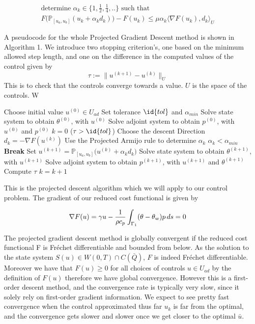 \begin{align*}
    \text{determine $\alpha_k \in \{1, \frac{1}{2},\frac{1}{4},.. \}$ such that } \\
    F \bigg (\mathbb{P}_{[u_a,u_b]}(u_k + \alpha_kd_k) \bigg ) - F(u_k) \leq \mu \alpha_k \langle \nabla F(u_k),d_k \rangle_{U}
\end{align*}

A pseudocode for the whole Projected Gradient Descent method is shown in Algorithm 1. We introduce two stopping criterion's, one based on the minimum allowed step length, and one on the difference in the computed values of the control given by 
\begin{equation}
    \label{eq:stopping}
    \tau := \|u^{(k+1)} - u^{(k)}\|_U 
\end{equation}
This is to check that the controls converge towards a value. $U$ is the space of the controls. W

\begin{codebox}
\li Choose initial value $u^{(0)}\in U_{ad}$
\li Set tolerance $\id{tol}$ and $\alpha_{min}$
\li Solve state system to obtain $\theta^{(0)}$, with $u^{(0)}$
\li Solve adjoint system to obtain $p^{(0)}$, with $u^{(0)}$ and $p^{(0)}$
\li $k=0$
\li \While ($\tau > \id{tol}$)  \Then
\li Choose the descent Direction $d_k = -\nabla F(u^{(k)})$
\li Use the Projected Armijo rule to determine $\alpha_k$
\li \If $\alpha_k < \alpha_{min}$ \Then 
\li \textbf{Break} \End
\li Set $u^{(k+1)} = \mathbb{P}_{[u_a,u_b]}\bigg (u^{(k)} + \alpha_k d_k \bigg )$
\li Solve state system to obtain $\theta^{(k+1)}$, with $u^{(k+1)}$
\li Solve adjoint system to obtain $p^{(k+1)}$, with $u^{(k+1)}$ and $\theta^{(k+1)}$
\li Compute $\tau$
\li $k = k +1$
\end{codebox}
This is the projected descent algorithm which we will apply to our control problem. The gradient of our reduced cost functional is given by

\begin{equation*}
    \nabla F(u) =  \gamma u - \frac{1}{\rho c_p} \int_{\Gamma_1} (\theta - \theta_w)p \mathop{ds} = 0
\end{equation*}

The projected gradient descent method is globally convergent if the reduced cost functional F is Fréchet differentiable and bounded from below. As the solution to the state system $S(u) \in W(0,T) \cap C(\bar{Q})$, $F$ is indeed Fréchet differentiable. Moreover we have that $F(u) \geq 0$ for all choices of controls $u \in U_{ad}$ by the definition of $F(u)$ therefore we have global convergence. However this is a first-order descent method, and the convergence rate is typically very slow, since it solely rely on first-order gradient information. We expect to see pretty fast convergence when the control approximated thus far $u_k$ is far from the optimal, and the convergence gets slower and slower once we get closer to the optimal $\bar{u}$. \bigskip

